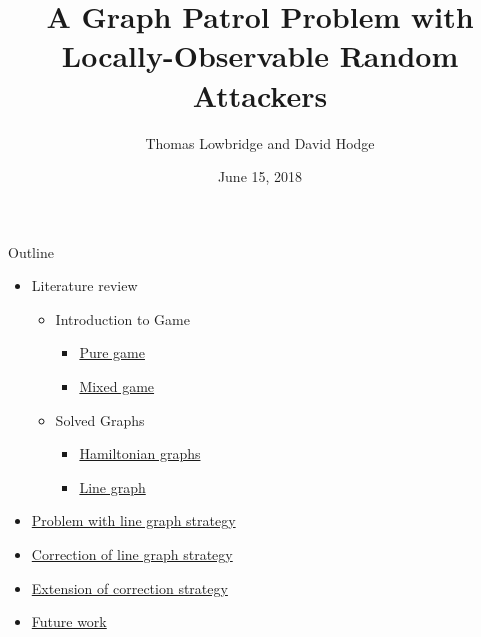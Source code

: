 \documentclass[10pt]{beamer}
\author{Thomas Lowbridge and David Hodge}
\title{A Graph Patrol Problem with Locally-Observable Random Attackers}
\institute{University Of Nottingham,UK}
\date{June 15, 2018}
\begin{document}
\hypertarget{Patrolling games}{}
\begin{frame}
\titlepage
\end{frame}


\begin{frame}{Outline}

\begin{itemize}
\item Literature review
 \begin{itemize}
 \item Introduction to Game
  \begin{itemize}
  \item \hyperlink{Introduction to game: Pure game}{Pure game}
  \item \hyperlink{Introduction to game: Mixed game}{Mixed game}
  \end{itemize}
 \item Solved Graphs
  \begin{itemize}
  \item \hyperlink{Solved graphs: Hamiltonian graphs}{Hamiltonian graphs}
  \item \hyperlink{Solved graphs: Line graph}{Line graph}
  \end{itemize}   
 \end{itemize}
\item \hyperlink{Problem with diametric strategy}{Problem with line graph strategy}
\item \hyperlink{Correction of diametric line graph strategy}{Correction of line graph strategy}
\item \hyperlink{Extension of correction strategy}{Extension of correction strategy}
\item \hyperlink{Future work}{Future work}
\end{itemize}
\end{frame}
\end{document}

